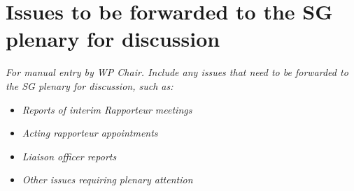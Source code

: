
\section{Issues to be forwarded to the SG\studyGroup{} plenary for discussion}\label{issues-for-plenary}

\textit{For manual entry by WP Chair. Include any issues that need to be forwarded to the SG plenary for discussion, such as:}
\begin{itemize}
    \item \textit{Reports of interim Rapporteur meetings}
    \item \textit{Acting rapporteur appointments}
    \item \textit{Liaison officer reports}
    \item \textit{Other issues requiring plenary attention}
\end{itemize}

